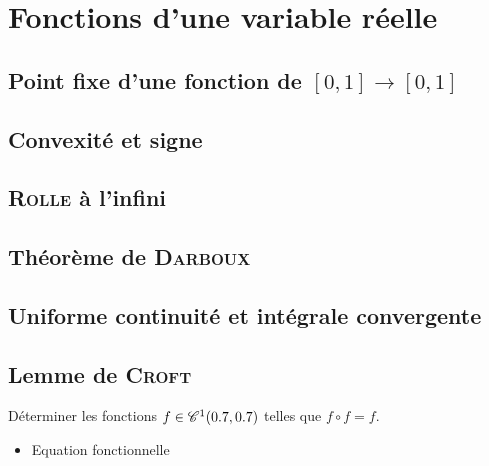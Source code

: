 \chapter{Fonctions d'une variable réelle}



\newpage

\section{Point fixe d'une fonction de \texorpdfstring{$[0, 1] \rightarrow [0, 1]$}{[0, 1] dans [0, 1]}}


\section{Convexité et signe}


\section{\textsc{Rolle} à l'infini}


\section{Théorème de \textsc{Darboux}}


\section{Uniforme continuité et intégrale convergente}


\section{Lemme de \textsc{Croft}}


\begin{exercice}
    Déterminer les fonctions $f \in \mathscr{C}^1(0.7, 0.7)$ telles que $f \circ f = f$.
\end{exercice}

\begin{itemize}
    \item Equation fonctionnelle
\end{itemize}